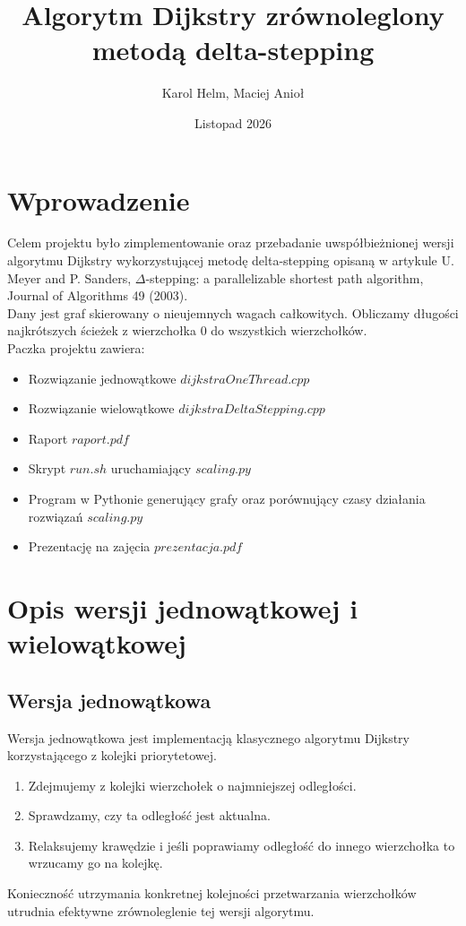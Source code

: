 \documentclass[12pt, a4paper]{article}
\title{Algorytm Dijkstry zrównoleglony metodą delta-stepping}
\author{Karol Helm, Maciej Anioł}
\date{Listopad 2026}
\begin{document}
\maketitle

\section{Wprowadzenie}
Celem projektu było zimplementowanie oraz przebadanie uwspółbieżnionej wersji algorytmu Dijkstry wykorzystującej metodę delta-stepping opisaną w artykule U. Meyer and P. Sanders, $\Delta$-stepping: a parallelizable shortest path algorithm, Journal of Algorithms 49 (2003). 
\\
Dany jest graf skierowany o nieujemnych wagach całkowitych. Obliczamy długości najkrótszych ścieżek z wierzchołka $0$ do wszystkich wierzchołków.
\\
Paczka projektu zawiera:
\begin{itemize}
    \item Rozwiązanie jednowątkowe $dijkstraOneThread.cpp$
    \item Rozwiązanie wielowątkowe $dijkstraDeltaStepping.cpp$
    \item Raport $raport.pdf$
    \item Skrypt $run.sh$ uruchamiający $scaling.py$
    \item Program w Pythonie generujący grafy oraz porównujący czasy działania rozwiązań $scaling.py$ 
    \item Prezentację na zajęcia $prezentacja.pdf$
\end{itemize}
\section{Opis wersji jednowątkowej i wielowątkowej}
\subsection{Wersja jednowątkowa}
Wersja jednowątkowa jest implementacją klasycznego algorytmu Dijkstry korzystającego z kolejki priorytetowej. 
\begin{enumerate}
    \item Zdejmujemy z kolejki wierzchołek o najmniejszej odległości.
    \item Sprawdzamy, czy ta odległość jest aktualna.
    \item Relaksujemy krawędzie i jeśli poprawiamy odległość do innego wierzchołka to wrzucamy go na kolejkę.
\end{enumerate}
Konieczność utrzymania konkretnej kolejności przetwarzania wierzchołków utrudnia efektywne zrównoleglenie tej wersji algorytmu.
\end{document}
